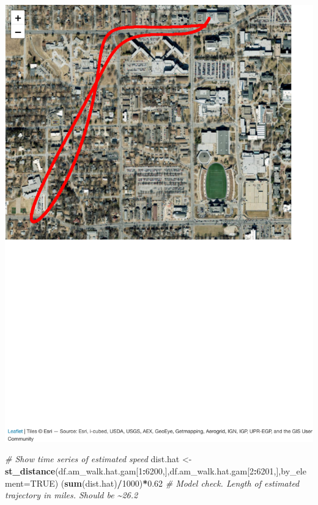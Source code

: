 \documentclass[
]{book}
\newenvironment{Shaded}{\begin{snugshade}}{\end{snugshade}}
\newcommand{\AttributeTok}[1]{\textcolor[rgb]{0.13,0.29,0.53}{#1}}
\newcommand{\CommentTok}[1]{\textcolor[rgb]{0.56,0.35,0.01}{\textit{#1}}}
\newcommand{\ConstantTok}[1]{\textcolor[rgb]{0.56,0.35,0.01}{#1}}
\newcommand{\DecValTok}[1]{\textcolor[rgb]{0.00,0.00,0.81}{#1}}
\newcommand{\FloatTok}[1]{\textcolor[rgb]{0.00,0.00,0.81}{#1}}
\newcommand{\FunctionTok}[1]{\textcolor[rgb]{0.13,0.29,0.53}{\textbf{#1}}}
\newcommand{\NormalTok}[1]{#1}
\newcommand{\OtherTok}[1]{\textcolor[rgb]{0.56,0.35,0.01}{#1}}
\newcommand{\SpecialCharTok}[1]{\textcolor[rgb]{0.81,0.36,0.00}{\textbf{#1}}}
\begin{document}
\includegraphics{_main_files/figure-latex/unnamed-chunk-8-2.pdf}

\begin{Shaded}
\begin{Highlighting}[]
\CommentTok{\# Show time series of estimated speed}
\NormalTok{dist.hat }\OtherTok{\textless{}{-}} \FunctionTok{st\_distance}\NormalTok{(df.am\_walk.hat.gam[}\DecValTok{1}\SpecialCharTok{:}\DecValTok{6200}\NormalTok{,],df.am\_walk.hat.gam[}\DecValTok{2}\SpecialCharTok{:}\DecValTok{6201}\NormalTok{,],}\AttributeTok{by\_element=}\ConstantTok{TRUE}\NormalTok{)}
\NormalTok{(}\FunctionTok{sum}\NormalTok{(dist.hat)}\SpecialCharTok{/}\DecValTok{1000}\NormalTok{)}\SpecialCharTok{*}\FloatTok{0.62} \CommentTok{\# Model check. Length of estimated trajectory in miles. Should be \textasciitilde{}26.2}
\end{Highlighting}
\end{Shaded}
\end{document}
